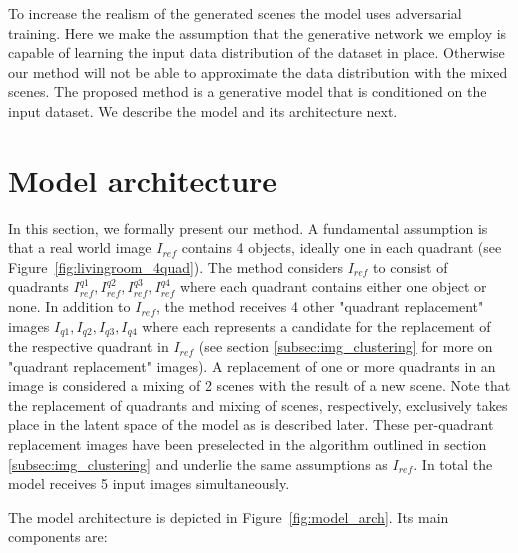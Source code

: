 \documentclass[a4paper,12pt]{report}
\begin{document}
To increase the realism of the generated scenes the model uses adversarial training. Here we make the assumption that the generative network we employ is capable of learning the input data distribution of the dataset in place. Otherwise our method will not be able to approximate the data distribution with the mixed scenes. The proposed method is a generative model that is conditioned on the input dataset. We describe the model and its architecture next.




\section{Model architecture}\label{subsec:model_arch}
In this section, we formally present our method. A fundamental assumption is that a real world image $I_{ref}$ contains 4 objects, ideally one in each quadrant (see Figure~\ref{fig:livingroom_4quad}). The method considers $I_{ref}$ to consist of quadrants $I^{q1}_{ref}, I^{q2}_{ref}, I^{q3}_{ref}, I^{q4}_{ref}$ where each quadrant contains either one object or none. In addition to $I_{ref}$, the method receives 4 other "quadrant replacement" images $I_{q1},I_{q2},I_{q3},I_{q4}$ where each represents a candidate for the replacement of the respective quadrant in $I_{ref}$ (see section \ref{subsec:img_clustering} for more on "quadrant replacement" images). A replacement of one or more quadrants in an image is considered a mixing of 2 scenes with the result of a new scene. Note that the replacement of quadrants and mixing of scenes, respectively, exclusively takes place in the latent space of the model as is described later. These per-quadrant replacement images have been preselected in the algorithm outlined in section \ref{subsec:img_clustering} and underlie the same assumptions as $I_{ref}$. In total the model receives 5 input images simultaneously.

The model architecture is depicted in Figure~\ref{fig:model_arch}. Its main components are:
\end{document}
